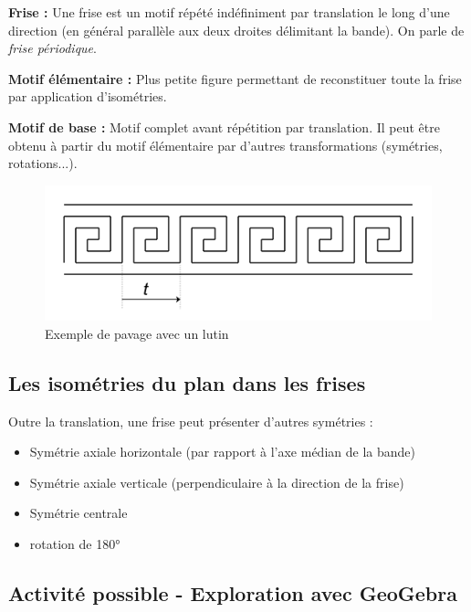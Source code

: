 \documentclass[12pt]{article}
\begin{document}
    \textbf{Frise :} Une frise est un motif répété indéfiniment par translation le long d'une direction (en général parallèle aux deux droites délimitant la bande). On parle de \textit{frise périodique}.

    \textbf{Motif élémentaire :} Plus petite figure permettant de reconstituer toute la frise par application d’isométries.

    \textbf{Motif de base :} Motif complet avant répétition par translation. Il peut être obtenu à partir du motif élémentaire par d'autres transformations (symétries, rotations...).

    \begin{figure}[h!]
        \centering
        \includegraphics[width=\textwidth]{frise_exemple.png}
        \caption{Exemple de pavage avec un lutin}
    \end{figure}

    \subsection{Les isométries du plan dans les frises}

    Outre la translation, une frise peut présenter d’autres symétries :

    \begin{itemize}
        \item Symétrie axiale horizontale (par rapport à l’axe médian de la bande)
        \item Symétrie axiale verticale (perpendiculaire à la direction de la frise)
        \item Symétrie centrale
        \item rotation de 180°
    \end{itemize}


    \subsection{Activité possible - Exploration avec GeoGebra}
\end{document}
